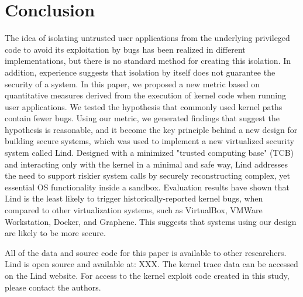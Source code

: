 \section{Conclusion}
\label{sec.conclusion}

The idea of isolating untrusted user applications from the underlying privileged code
to avoid its exploitation by bugs has been realized in different implementations,
but there is no standard method for creating this isolation.
In addition, experience suggests that isolation by itself does not guarantee the security of a system.
%
In this paper, we proposed a new metric based on quantitative measures derived from
the execution of kernel code when running user applications.
We tested the hypothesis that commonly used kernel paths contain fewer bugs.
Using our metric, we generated findings that suggest the hypothesis is reasonable,
 and it become the key principle behind a new design for building secure systems,
which was used to implement a new virtualized security system called Lind. Designed with a minimized
"trusted computing base" (TCB) and interacting only with the kernel in a minimal and safe
way, Lind addresses the need to support riskier system calls by securely
reconstructing complex, yet essential OS functionality inside a sandbox.
%
Evaluation results have shown that Lind is the least likely to trigger historically-reported kernel bugs,
when compared to other virtualization systems, such as VirtualBox, VMWare Workstation, Docker, and Graphene.
This suggests that systems using our design
are likely to be more secure.

All of the data and source code for this paper is available to other
researchers.  Lind is open source and available at: XXX.  The kernel
trace data can be accessed on the Lind website.  For access
to the kernel exploit code created in this study, please contact the
authors.
